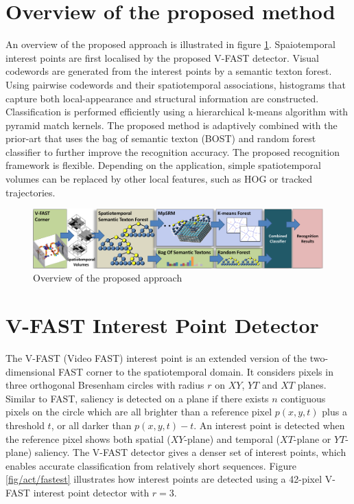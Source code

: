 \section{Overview of the proposed method}
\label{sec/act/overview}
An overview of the proposed approach is illustrated in figure \ref{fig/act/flow}. Spaiotemporal interest points are first localised by the proposed V-FAST detector. Visual codewords are generated from the interest points by a semantic texton forest. Using pairwise codewords and their spatiotemporal associations, histograms that capture both local-appearance and structural information are constructed. Classification is performed efficiently using a hierarchical k-means algorithm with pyramid match kernels. The proposed method is adaptively combined with the prior-art that uses the bag of semantic texton (BOST) and random forest classifier to further improve the recognition accuracy.
The proposed recognition framework is flexible. Depending on the application, simple spatiotemporal volumes can be replaced by other local features, such as HOG or tracked trajectories.

\begin{figure}
\includegraphics[width=1.0\linewidth]{fig/act/fig1_new.pdf}%
\caption{Overview of the proposed approach}
\label{fig/act/flow}
\end{figure}

\section{V-FAST Interest Point Detector}
\label{sec/act/fastest}
The V-FAST (Video FAST) interest point is an extended version of the two-dimensional FAST corner \cite{Rosten2006} to the spatiotemporal domain. It considers pixels in three orthogonal Bresenham circles with radius $r$ on $XY$, $YT$ and $XT$ planes. Similar to FAST, saliency is detected on a plane if there exists $n$ contiguous pixels on the circle which are all brighter than a reference pixel $p(x,y,t)$ plus a threshold $t$, or all darker than $p(x,y,t)-t$. An interest point is detected when the reference pixel shows both spatial ($XY$-plane) and temporal ($XT$-plane or $YT$-plane) saliency. The V-FAST detector gives a denser set of interest points, which enables accurate classification from relatively short sequences. Figure \ref{fig/act/fastest} illustrates how interest points are detected using a 42-pixel V-FAST interest point detector with $r = 3$.

